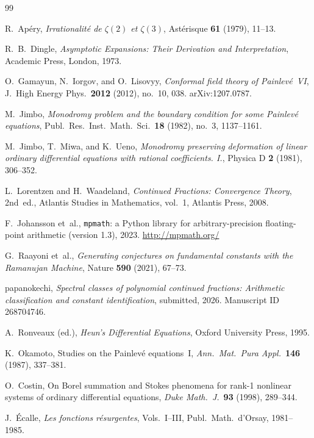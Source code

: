 \documentclass[11pt,a4paper]{article}
\theoremstyle{definition}
\theoremstyle{remark}
\begin{document}
\begin{thebibliography}{99}

R.~Ap\'ery,
\emph{Irrationalit\'e de $\zeta(2)$ et
$\zeta(3)$},
Ast\'erisque \textbf{61} (1979), 11--13.

R.~B.~Dingle,
\emph{Asymptotic Expansions: Their
Derivation and Interpretation},
Academic Press, London, 1973.

O.~Gamayun, N.~Iorgov, and O.~Lisovyy,
\emph{Conformal field theory of
Painlev\'e~VI},
J.~High Energy Phys.\ \textbf{2012}
(2012), no.~10, 038.
arXiv:1207.0787.

M.~Jimbo,
\emph{Monodromy problem and the boundary
condition for some Painlev\'e equations},
Publ.\ Res.\ Inst.\ Math.\ Sci.\
\textbf{18} (1982), no.~3, 1137--1161.

M.~Jimbo, T.~Miwa, and K.~Ueno,
\emph{Monodromy preserving deformation of
linear ordinary differential equations with
rational coefficients. I.},
Physica D \textbf{2} (1981), 306--352.

L.~Lorentzen and H.~Waadeland,
\emph{Continued Fractions: Convergence Theory},
2nd~ed., Atlantis Studies in Mathematics,
vol.~1, Atlantis Press, 2008.

F.~Johansson et~al.,
\texttt{mpmath}: a Python library for
arbitrary-precision floating-point arithmetic
(version 1.3), 2023.
\url{http://mpmath.org/}

G.~Raayoni et~al.,
\emph{Generating conjectures on fundamental
constants with the Ramanujan Machine},
Nature \textbf{590} (2021), 67--73.

papanokechi,
\emph{Spectral classes of polynomial
continued fractions: Arithmetic
classification and constant identification},
submitted, 2026.
Manuscript ID 268704746.

A.~Ronveaux (ed.),
\emph{Heun's Differential Equations},
Oxford University Press, 1995.

K.~Okamoto,
Studies on the Painlev\'e equations~I,
\emph{Ann.\ Mat.\ Pura Appl.}\ \textbf{146} (1987), 337--381.

O.~Costin,
On Borel summation and Stokes phenomena for rank-1 nonlinear
systems of ordinary differential equations,
\emph{Duke Math.\ J.}\ \textbf{93} (1998), 289--344.

J.~\'Ecalle,
\emph{Les fonctions r\'esurgentes}, Vols.~I--III,
Publ.\ Math.\ d'Orsay, 1981--1985.

\end{thebibliography}
\end{document}
